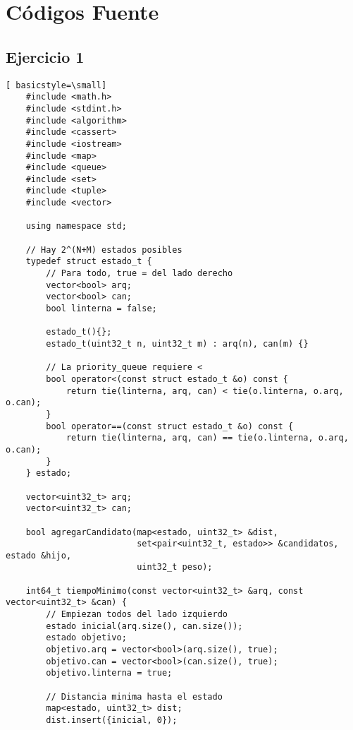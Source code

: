 \section{Códigos Fuente}
\subsection{Ejercicio 1}


\begin{lstlisting}[ basicstyle=\small]
    #include <math.h>
    #include <stdint.h>
    #include <algorithm>
    #include <cassert>
    #include <iostream>
    #include <map>
    #include <queue>
    #include <set>
    #include <tuple>
    #include <vector>

    using namespace std;

    // Hay 2^(N+M) estados posibles
    typedef struct estado_t {
        // Para todo, true = del lado derecho
        vector<bool> arq;
        vector<bool> can;
        bool linterna = false;

        estado_t(){};
        estado_t(uint32_t n, uint32_t m) : arq(n), can(m) {}

        // La priority_queue requiere <
        bool operator<(const struct estado_t &o) const {
            return tie(linterna, arq, can) < tie(o.linterna, o.arq, o.can);
        }
        bool operator==(const struct estado_t &o) const {
            return tie(linterna, arq, can) == tie(o.linterna, o.arq, o.can);
        }
    } estado;

    vector<uint32_t> arq;
    vector<uint32_t> can;

    bool agregarCandidato(map<estado, uint32_t> &dist,
                          set<pair<uint32_t, estado>> &candidatos, estado &hijo,
                          uint32_t peso);

    int64_t tiempoMinimo(const vector<uint32_t> &arq, const vector<uint32_t> &can) {
        // Empiezan todos del lado izquierdo
        estado inicial(arq.size(), can.size());
        estado objetivo;
        objetivo.arq = vector<bool>(arq.size(), true);
        objetivo.can = vector<bool>(can.size(), true);
        objetivo.linterna = true;

        // Distancia minima hasta el estado
        map<estado, uint32_t> dist;
        dist.insert({inicial, 0});


\end{lstlisting}
